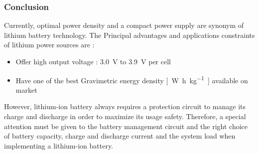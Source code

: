 \documentclass[report.tex]{subfiles}
\begin{document}
\begin{table}[H]
\centering
{}
\caption{Lithium Ion Cathode Chemistry Comparison table\cite{litBatTech}}
\label{tab:litBatTech}
\end{table}

\subsubsection{Conclusion}
Currently, optimal power density and a compact power supply are synonym of lithium battery technology. The Principal advantages and applications constraints of lithium power sources are :
\begin{itemize}
\item Offer high output voltage : \SI{3.0}{\volt} to \SI{3.9}{\volt} per cell
\item Have one of the best Gravimetric energy density \si{[\watt\hour\per\kilo\gram]} available on market
\end{itemize}
However, lithium-ion battery always requires a protection circuit to manage its charge and discharge in order to maximize its usage safety. Therefore, a special attention must be given to the battery management circuit and the right choice of battery capacity, charge and discharge current and the system load when implementing a lithium-ion battery.
\end{document}
